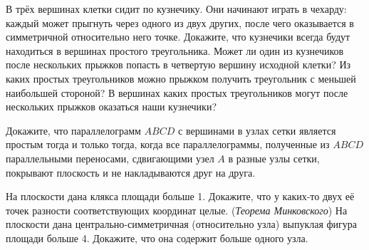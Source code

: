 \documentclass[a4paper,11pt]{article}
\begin{document}

В трёх вершинах клетки сидит по кузнечику. Они начинают играть в чехарду:
каждый может прыгнуть через одного из двух других, после чего оказывается в симметричной
относительно него точке.
 Докажите, что кузнечики всегда будут находиться в вершинах простого треугольника.
 Может ли один из кузнечиков после нескольких прыжков попасть в четвертую вершину
исходной клетки?
 Из каких простых треугольников можно прыжком получить треугольник
с меньшей наибольшей стороной?
 В вершинах каких простых треугольников могут после нескольких прыжков оказаться наши кузнечики?





Докажите, что параллелограмм $ABCD$ с вершинами в узлах сетки является
простым тогда и только тогда, когда все %
параллелограммы, полученные из $ABCD$ параллельными переносами,
сдвигающими узел $A$
в разные узлы сетки, покрывают плоскость и не накладываются
друг на друга.

На плоскости дана клякса площади больше 1. Докажите, что
у каких-то двух её точек
разности соответствующих координат целые.
  ({\it Теорема Минковского})
На плоскости дана центрально-симметричная (относительно узла)
выпуклая фигура площади больше 4. Докажите, что она
содержит больше одного узла.
\end{document}
